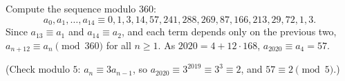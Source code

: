 Compute the sequence modulo $360$:
\[a_0,a_1,\dots,a_{14}\equiv0,1,3,14,57,241,288,269,87,166,213,29,72,1,3.\]
Since $a_{13}\equiv a_1$ and $a_{14}\equiv a_2$, and each term depends only on the previous two, $a_{n+12}\equiv a_n\pmod{360}$ for all $n\ge1$. As $2020=4+12\cdot168$, $a_{2020}\equiv a_4=\boxed{57}$.

(Check modulo $5$: $a_n\equiv3a_{n-1}$, so $a_{2020}\equiv3^{2019}\equiv3^3\equiv2$, and $57\equiv2\pmod5$.)
